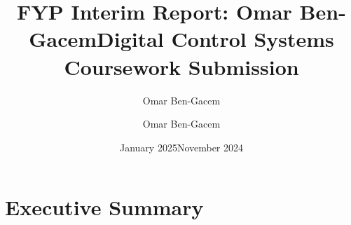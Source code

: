 \documentclass{article}
\title{FYP Interim Report: Omar Ben-Gacem}
\author{Omar Ben-Gacem}
\date{January 2025}
\title{Digital Control Systems Coursework Submission}
\author{Omar Ben-Gacem}
\date{November 2024}
\begin{document}
\section*{Executive Summary}
\end{document}
